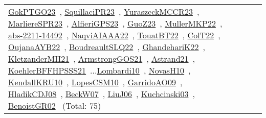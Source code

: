 {\begin{longtable}{p{3cm}r>{\raggedright\arraybackslash}p{6cm}>{\raggedright\arraybackslash}p{6cm}>{\raggedright\arraybackslash}p{8cm}}
\href{../works/GokPTGO23.pdf}{GokPTGO23}~\cite{GokPTGO23}, \href{../works/SquillaciPR23.pdf}{SquillaciPR23}~\cite{SquillaciPR23}, \href{../works/YuraszeckMCCR23.pdf}{YuraszeckMCCR23}~\cite{YuraszeckMCCR23}, \href{../works/MarliereSPR23.pdf}{MarliereSPR23}~\cite{MarliereSPR23}, \href{../works/AlfieriGPS23.pdf}{AlfieriGPS23}~\cite{AlfieriGPS23}, \href{../works/GuoZ23.pdf}{GuoZ23}~\cite{GuoZ23}, \href{../works/MullerMKP22.pdf}{MullerMKP22}~\cite{MullerMKP22}, \href{../works/abs-2211-14492.pdf}{abs-2211-14492}~\cite{abs-2211-14492}, \href{../works/NaqviAIAAA22.pdf}{NaqviAIAAA22}~\cite{NaqviAIAAA22}, \href{../works/TouatBT22.pdf}{TouatBT22}~\cite{TouatBT22}, \href{../works/ColT22.pdf}{ColT22}~\cite{ColT22}, \href{../works/OujanaAYB22.pdf}{OujanaAYB22}~\cite{OujanaAYB22}, \href{../works/BoudreaultSLQ22.pdf}{BoudreaultSLQ22}~\cite{BoudreaultSLQ22}, \href{../works/GhandehariK22.pdf}{GhandehariK22}~\cite{GhandehariK22}, \href{../works/KletzanderMH21.pdf}{KletzanderMH21}~\cite{KletzanderMH21}, \href{../works/ArmstrongGOS21.pdf}{ArmstrongGOS21}~\cite{ArmstrongGOS21}, \href{../works/Astrand21.pdf}{Astrand21}~\cite{Astrand21}, \href{../works/KoehlerBFFHPSSS21.pdf}{KoehlerBFFHPSSS21}~\cite{KoehlerBFFHPSSS21}...\href{../works/Lombardi10.pdf}{Lombardi10}~\cite{Lombardi10}, \href{../works/NovasH10.pdf}{NovasH10}~\cite{NovasH10}, \href{../works/KendallKRU10.pdf}{KendallKRU10}~\cite{KendallKRU10}, \href{../works/LopesCSM10.pdf}{LopesCSM10}~\cite{LopesCSM10}, \href{../works/GarridoAO09.pdf}{GarridoAO09}~\cite{GarridoAO09}, \href{../works/HladikCDJ08.pdf}{HladikCDJ08}~\cite{HladikCDJ08}, \href{../works/BeckW07.pdf}{BeckW07}~\cite{BeckW07}, \href{../works/LiuJ06.pdf}{LiuJ06}~\cite{LiuJ06}, \href{../works/Kuchcinski03.pdf}{Kuchcinski03}~\cite{Kuchcinski03}, \href{../works/BenoistGR02.pdf}{BenoistGR02}~\cite{BenoistGR02} (Total: 75)\\

\end{longtable}}
